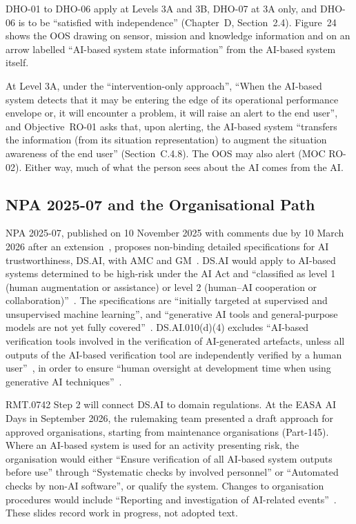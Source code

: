 \documentclass{aer}
\begin{document}
DHO-01 to DHO-06 apply at Levels 3A and 3B, DHO-07 at 3A only, and DHO-06 is to be ``satisfied with independence'' (Chapter~D, Section~2.4). Figure~24 shows the OOS drawing on sensor, mission and knowledge information and on an arrow labelled ``AI-based system state information'' from the AI-based system itself.

At Level 3A, under the ``intervention-only approach'', ``When the AI-based system detects that it may be entering the edge of its operational performance envelope or, it will encounter a problem, it will raise an alert to the end user'', and Objective~RO-01 asks that, upon alerting, the AI-based system ``transfers the information (from its situation representation) to augment the situation awareness of the end user'' (Section~C.4.8). The OOS may also alert (MOC RO-02). Either way, much of what the person sees about the AI comes from the AI.

\subsection{NPA 2025-07 and the Organisational Path}\label{sec:npa}

NPA 2025-07, published on 10 November 2025 with comments due by 10 March 2026 after an extension~\citep{easa2025npaweb}, proposes non-binding detailed specifications for AI trustworthiness, DS.AI, with AMC and GM~\citep{easa2025npaA,easa2025npaB}. DS.AI would apply to AI-based systems determined to be high-risk under the AI Act and ``classified as level 1 (human augmentation or assistance) or level 2 (human--AI cooperation or collaboration)''~\citep[DS.AI.010(c)]{easa2025npaB}. The specifications are ``initially targeted at supervised and unsupervised machine learning'', and ``generative AI tools and general-purpose models are not yet fully covered''~\citep[Sections~2.3 and~3]{easa2025npaA}. DS.AI.010(d)(4) excludes ``AI-based verification tools involved in the verification of AI-generated artefacts, unless all outputs of the AI-based verification tool are independently verified by a human user''~\citep{easa2025npaB}, in order to ensure ``human oversight at development time when using generative AI techniques''~\citep[Section~2.3]{easa2025npaA}.

RMT.0742 Step 2 will connect DS.AI to domain regulations. At the EASA AI Days in September 2026, the rulemaking team presented a draft approach for approved organisations, starting from maintenance organisations (Part-145). Where an AI-based system is used for an activity presenting risk, the organisation would either ``Ensure verification of all AI-based system outputs before use'' through ``Systematic checks by involved personnel'' or ``Automated checks by non-AI software'', or qualify the system. Changes to organisation procedures would include ``Reporting and investigation of AI-related events''~\citep[slides~25 and~26]{easa2026aidays}. These slides record work in progress, not adopted text.
\end{document}
